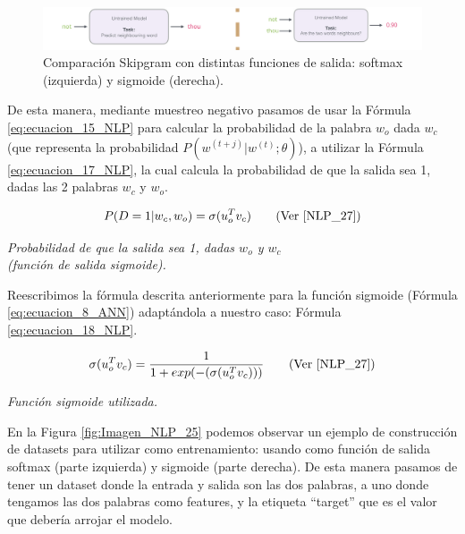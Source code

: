\documentclass[12pt,a4paper]{article}
\begin{document}
\begin{sloppypar}
\begin{figure}[H]    
 \centering
 \includegraphics[width=1\textwidth]{images/NLP/24.png}
 \captionsetup{justification=centering,margin=2cm}
 \caption{Comparación Skipgram con distintas funciones de salida: softmax (izquierda) y sigmoide (derecha)\cite{datitos_nlp}.}
 \label{fig:Imagen_NLP_24}
\end{figure}

De esta manera, mediante muestreo negativo pasamos de usar la Fórmula \ref{eq:ecuacion_15_NLP} para calcular la probabilidad de la palabra $w_o$ dada $w_c$ (que representa la probabilidad $P(w^{(t+j)} | w^{(t)}; \theta)$), a utilizar la Fórmula \ref{eq:ecuacion_17_NLP}, la cual calcula la probabilidad de que la salida sea 1, dadas las 2 palabras $w_c$ y $w_o$.  

\begin{equation}\label{eq:ecuacion_17_NLP}
P(D=1 | w_c, w_o) = \sigma (u_{o}^{T} v_c)    \qquad \text{(Ver \cite{NLP_27})}
\end{equation}
\begin{center}
\textit{Probabilidad de que la salida sea 1, dadas $w_o$ y $w_c$  \\ (función de salida sigmoide).}
\end{center}

Reescribimos la fórmula descrita anteriormente para la función sigmoide (Fórmula \ref{eq:ecuacion_8_ANN}) adaptándola a nuestro caso: Fórmula \ref{eq:ecuacion_18_NLP}.

\begin{equation}\label{eq:ecuacion_18_NLP}
\sigma (u_{o}^{T} v_c) = \frac{1}{1 + exp(- (\sigma (u_{o}^{T} v_c)) )}    \qquad \text{(Ver \cite{NLP_27})}
\end{equation}
\begin{center}
\textit{Función sigmoide utilizada.}
\end{center}

En la Figura \ref{fig:Imagen_NLP_25} podemos observar un ejemplo de construcción de datasets para utilizar como entrenamiento: usando como función de salida softmax (parte izquierda) y sigmoide (parte derecha). De esta manera pasamos de tener un dataset donde la entrada y salida son las dos palabras, a uno donde tengamos las dos palabras como features, y la etiqueta “target” que es el valor que debería arrojar el modelo.


\end{sloppypar}
\end{document}
